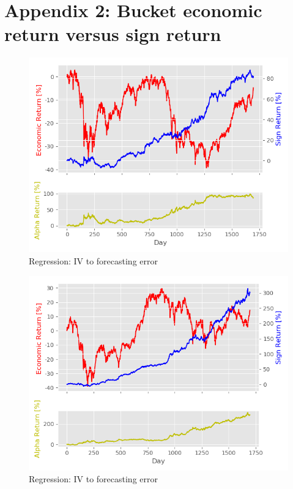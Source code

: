 \section*{Appendix 2: Bucket economic return versus sign return}
\begin{figure}[h]
    \centering
    \includegraphics[scale = 0.5]{Plot/BucketNumber1ReturnPlot.png}
    \caption{Regression: IV to forecasting error}
    \label{visualization}
\end{figure}

\begin{figure}[h]
    \centering
    \includegraphics[scale = 0.5]{Plot/BucketNumber2ReturnPlot.png}
    \caption{Regression: IV to forecasting error}
    \label{visualization}
\end{figure}

